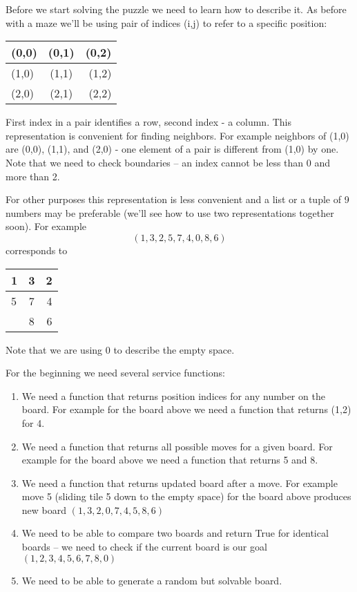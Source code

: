 Before we start solving the puzzle we need to learn how to describe it.
As before with a maze we'll be using pair of indices (i,j) to refer to
a specific position:

\begin{center}
\begin{tabular}{ | l | c | r | }
    \hline
    (0,0) & (0,1) & (0,2) \\ \hline
    (1,0) & (1,1) & (1,2) \\ \hline
    (2,0) & (2,1) & (2,2) \\
    \hline
  \end{tabular}
\end{center}
First index in a pair identifies a row, second index - a column.
This representation is convenient for finding neighbors. For example
neighbors of (1,0) are (0,0), (1,1), and (2,0) - one element of
a pair is different from (1,0) by one. Note that we need to check
boundaries -- an index cannot be less than 0 and more than 2.

For other purposes this representation is less convenient and
a list or a tuple of 9 numbers may be preferable (we'll see how to
use two representations together soon). For example
$$
(1,3,2,5,7,4,0,8,6)
$$
corresponds to
\begin{center}
\begin{tabular}{ | l | c | r | }
    \hline
    1 & 3 & 2 \\ \hline
    5 & 7 & 4 \\ \hline
      & 8 & 6  \\
    \hline
  \end{tabular}
\end{center}
Note that we are using 0 to describe the empty space.

For the beginning we need several service functions:
\begin{enumerate}
\item We need a function that returns position indices for any number on
the board. For example for the board above we need a function
that returns (1,2) for 4.
\item We need a function that returns all possible moves for a given
board. For example for the board above we need a function that returns
5 and 8.
\item We need a function that returns updated board after a move.
For example move 5 (sliding tile 5 down to the empty space) for the 
board above produces new board $(1,3,2,0,7,4,5,8,6)$
\item We need to be able to compare two boards and return True for
identical boards -- we need to check if the current board is our
goal $(1,2,3,4,5,6,7,8,0)$
\item We need to be able to generate a random but solvable board. 
\end{enumerate}


